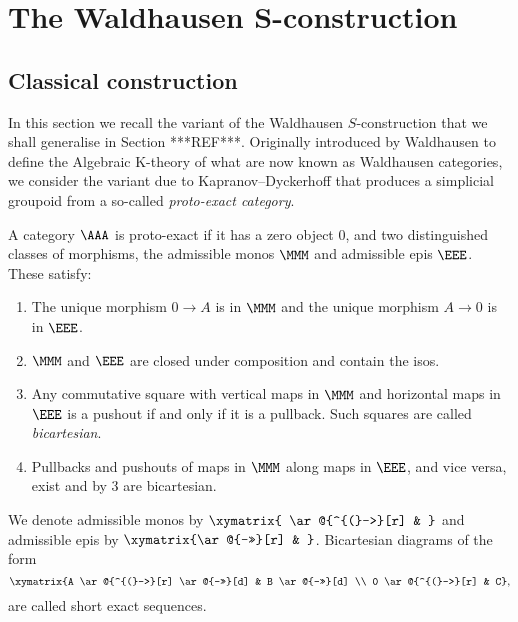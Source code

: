 \section{The Waldhausen S-construction}
\label{Waldhausentwo}

\subsection{Classical construction}
        In this section we recall the variant of the Waldhausen $S$-construction that we shall generalise in Section ***REF***. Originally introduced by Waldhausen to define the Algebraic K-theory of what are now known as Waldhausen categories, we consider the variant due to Kapranov--Dyckerhoff \cite{KapranovDyckerhoff} that produces a simplicial groupoid from a so-called {\em proto-exact category}. 

\begin{Definition}
 A category $\AAA$ is  proto-exact if it has a zero object $0$, and two distinguished classes of morphisms, the admissible monos $\MMM$ and admissible epis $\EEE$. These satisfy:
 \begin{enumerate}
  \item The unique morphism $0 \to A$ is in $\MMM$ and the unique morphism $A \to 0$ is in $\EEE$.
  \item $\MMM$ and $\EEE$ are closed under composition and contain the isos.
  \item Any commutative square with vertical maps in $\MMM$ and horizontal maps in $\EEE$ is a pushout if and only if it is a pullback. Such squares are called {\em bicartesian}.
  \item Pullbacks and pushouts of maps in $\MMM$ along maps in $\EEE$, and vice versa, exist and by $3$ are bicartesian.
 \end{enumerate}
\end{Definition}

\begin{Remark}
We denote admissible monos by $\xymatrix{  \ar@{^{(}->}[r] & }$ and admissible epis by $\xymatrix{\ar@{->>}[r] & }$. Bicartesian diagrams of the form
 \begin{equation}
  \xymatrix{A \ar@{^{(}->}[r] \ar@{->>}[d] & B \ar@{->>}[d] \\
  0 \ar@{^{(}->}[r] & C},
 \end{equation}
are called short exact sequences.
\end{Remark}

